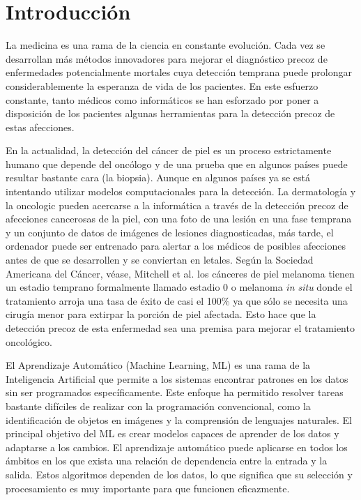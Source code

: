 \chapter*{Introducción}\label{chapter:introduction}

La medicina es una rama de la ciencia en constante evolución. 
Cada vez se desarrollan más métodos innovadores para mejorar el diagnóstico precoz de enfermedades potencialmente mortales cuya detección temprana puede prolongar considerablemente la esperanza de vida de los pacientes. 
En este esfuerzo constante, tanto médicos como informáticos se han esforzado por poner a disposición de los pacientes algunas herramientas para la detección precoz de estas afecciones.

En la actualidad, la detección del cáncer de piel es un proceso estrictamente humano que depende del oncólogo y de una prueba que en algunos países puede resultar bastante cara (la biopsia). 
Aunque en algunos países ya se está intentando utilizar modelos computacionales para la detección.
La dermatología y la oncologic pueden acercarse a la informática a través de la detección precoz de afecciones cancerosas de la piel, con una foto de una lesión en una fase temprana y un conjunto de datos de imágenes de lesiones diagnosticadas, más tarde, el ordenador puede ser entrenado para alertar a los médicos de posibles afecciones antes de que se desarrollen y se conviertan en letales. 
Según la Sociedad Americana del Cáncer, véase, Mitchell et al. %
los cánceres de piel melanoma tienen un estadio temprano formalmente llamado estadio 0 o
 melanoma \textit{in situ} donde el tratamiento arroja una tasa de éxito de casi el 100\% ya que sólo se necesita una cirugía menor para extirpar la porción de piel afectada. 
Esto hace que la detección precoz de esta enfermedad sea una premisa para mejorar el tratamiento oncológico.

El Aprendizaje Automático (Machine Learning, ML) es una rama de la Inteligencia Artificial que permite a los sistemas encontrar patrones en los datos sin ser programados específicamente. 
Este enfoque ha permitido resolver tareas bastante difíciles de realizar con la programación convencional, como la identificación de objetos en imágenes y la comprensión de lenguajes naturales. 
El principal objetivo del ML es crear modelos capaces de aprender de los datos y adaptarse a los cambios. 
El aprendizaje automático puede aplicarse en todos los ámbitos en los que exista una relación de dependencia entre la entrada y la salida. 
Estos algoritmos dependen de los datos, lo que significa que su selección y procesamiento es muy importante para que funcionen eficazmente.

